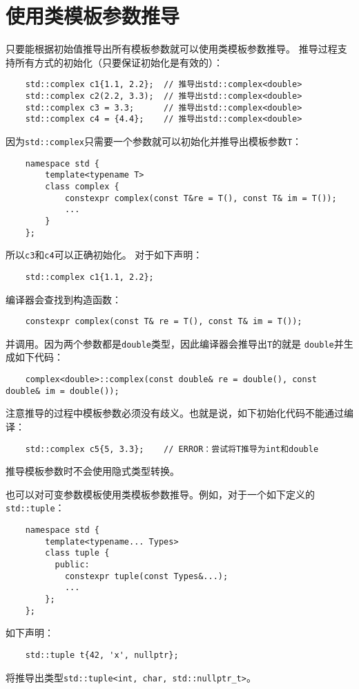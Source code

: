 \section{使用类模板参数推导}
只要能根据初始值推导出所有模板参数就可以使用类模板参数推导。
推导过程支持所有方式的初始化（只要保证初始化是有效的）：
\begin{lstlisting}
    std::complex c1{1.1, 2.2};  // 推导出std::complex<double>
    std::complex c2(2.2, 3.3);  // 推导出std::complex<double>
    std::complex c3 = 3.3;      // 推导出std::complex<double>
    std::complex c4 = {4.4};    // 推导出std::complex<double>
\end{lstlisting}
因为\texttt{std::complex}只需要一个参数就可以初始化并推导出模板参数\texttt{T}：
\begin{lstlisting}
    namespace std {
        template<typename T>
        class complex {
            constexpr complex(const T&re = T(), const T& im = T());
            ...
        }
    };
\end{lstlisting}
所以\texttt{c3}和\texttt{c4}可以正确初始化。
对于如下声明：
\begin{lstlisting}
    std::complex c1{1.1, 2.2};
\end{lstlisting}
编译器会查找到构造函数：
\begin{lstlisting}
    constexpr complex(const T& re = T(), const T& im = T());
\end{lstlisting}
并调用。因为两个参数都是\texttt{double}类型，因此编译器会推导出\texttt{T}的就是
\texttt{double}并生成如下代码：
\begin{lstlisting}
    complex<double>::complex(const double& re = double(), const double& im = double());
\end{lstlisting}
注意推导的过程中模板参数必须没有歧义。也就是说，如下初始化代码不能通过编译：
\begin{lstlisting}
    std::complex c5{5, 3.3};    // ERROR：尝试将T推导为int和double
\end{lstlisting}
推导模板参数时不会使用隐式类型转换。

也可以对可变参数模板使用类模板参数推导。例如，对于一个如下定义的\texttt{std::tuple}：
\begin{lstlisting}
    namespace std {
        template<typename... Types>
        class tuple {
          public:
            constexpr tuple(const Types&...);
            ...
        };
    };
\end{lstlisting}
如下声明：
\begin{lstlisting}
    std::tuple t{42, 'x', nullptr};
\end{lstlisting}
将推导出类型\texttt{std::tuple<int, char, std::nullptr\_t>}。

